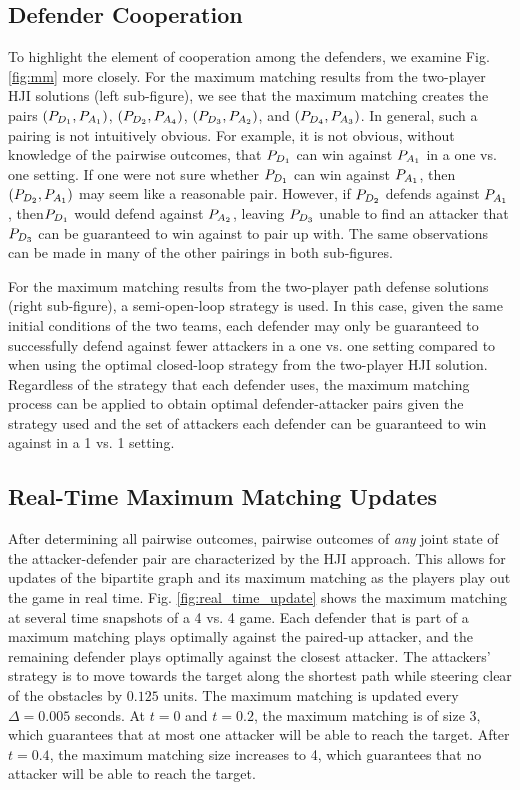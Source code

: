 \subsection{Defender Cooperation}
To highlight the element of cooperation among the defenders, we examine Fig. \ref{fig:mm} more closely. For the maximum matching results from the two-player HJI solutions (left sub-figure), we see that the maximum matching creates the pairs $(P_{D_{1}}, P_{A_{1}})$, $(P_{D_{2}}, P_{A_{4}})$, $(P_{D_{3}}, P_{A_{2}})$, and $(P_{D_{4}}, P_{A_{3}})$. In general, such a pairing is not intuitively obvious. For example, it is not obvious, without knowledge of the pairwise outcomes, that $P_{D_{1}}$ can win against $P_{A_{1}}$ in a one vs. one setting. If one were not sure whether $P_{D_{1}}$ can win against $P_{A_{1}}$, then $(P_{D_{2}}, P_{A_{1}})$ may seem like a reasonable pair. However, if $P_{D_{2}}$ defends against $P_{A_{1}}$, then$P_{D_{1}}$ would defend against $P_{A_{2}}$, leaving $P_{D_{3}}$ unable to find an attacker that $P_{D_{3}}$ can be guaranteed to win against to pair up with. The same observations can be made in many of the other pairings in both sub-figures.

For the maximum matching results from the two-player path defense solutions (right sub-figure), a semi-open-loop strategy is used. In this case, given the same initial conditions of the two teams, each defender may only be guaranteed to successfully defend against fewer attackers in a one vs. one setting compared to when using the optimal closed-loop strategy from the two-player HJI solution. Regardless of the strategy that each defender uses, the maximum matching process can be applied to obtain optimal defender-attacker pairs given the strategy used and the set of attackers each defender can be guaranteed to win against in a 1 vs. 1 setting.

\subsection{Real-Time Maximum Matching Updates}
After determining all pairwise outcomes, pairwise outcomes of \textit{any} joint state of the attacker-defender pair are characterized by the HJI approach. This allows for updates of the bipartite graph and its maximum matching as the players play out the game in real time. Fig. \ref{fig:real_time_update} shows the maximum matching at several time snapshots of a 4 vs. 4 game. Each defender that is part of a maximum matching plays optimally against the paired-up attacker, and the remaining defender plays optimally against the closest attacker. The attackers' strategy is to move towards the target along the shortest path while steering clear of the obstacles by $0.125$ units. The maximum matching is updated every $\Delta=0.005$ seconds. At $t=0$ and $t=0.2$, the maximum matching is of size 3, which guarantees that at most one attacker will be able to reach the target. After $t=0.4$, the maximum matching size increases to 4, which guarantees that no attacker will be able to reach the target.

